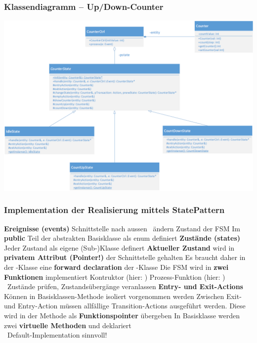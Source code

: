 \subsubsection{Klassendiagramm -- Up/Down-Counter}
\label{Klassendiagramm -- Up/Down-Counter - StatePattern}

\begin{center}
    \includegraphics[width=0.95\columnwidth]{images/fsm_up-down-counter_klassendiagramm_state_pattern.png}
\end{center}


\subsubsection{Implementation der Realisierung mittels StatePattern}

\begin{outline}
    \1 \textbf{Ereignisse (events)}
        \2 Schnittstelle nach aussen \textrightarrow\ ändern Zustand der FSM
        \2 Im \textbf{public} Teil der abstrakten Basisklasse als enum definiert
    \1 \textbf{Zustände (states)}
        \2 Jeder Zustand als eigene (Sub-)Klasse definert
    \1 \textbf{Aktueller Zustand}  wird in \textbf{privatem Attribut (Pointer!)} der Schnittstelle gehalten
        \2 Es braucht daher in der -Klasse eine \textbf{forward declaration} der -Klasse
    \1 Die FSM wird in \textbf{zwei Funktionen} implementiert
        \2 Kontruktor (hier: )
        \2 Prozess-Funktion (hier: ) \\
            \textrightarrow\ Zustände prüfen, Zustandsübergänge veranlassen
    \1 \textbf{Entry- und Exit-Actions}
        \2 Können in Basisklassen-Methode  isoliert vorgenommen werden
        \2 Zwischen Exit- und Entry-Action müssen allfällige Transition-Actions ausgeführt werden. Diese wird in der Methode 
             als \textbf{Funktionspointer} übergeben
        \2 In Basisklasse werden zwei \textbf{virtuelle Methoden}  und  deklariert \\
            \textrightarrow\ Default-Implementation sinnvoll!
\end{outline}


